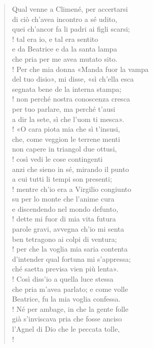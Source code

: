 \documentclass[a4paper, twoside, titlepage]{book}
\begin{document}
\begin{verse}
Qual venne a Climené, per accertarsi\\
di ciò ch’avea incontro a sé udito,\\
quei ch’ancor fa li padri ai figli scarsi;\\!
tal era io, e tal era sentito\\
e da Beatrice e da la santa lampa\\
che pria per me avea mutato sito.\\!
Per che mia donna «Manda fuor la vampa\\
del tuo disio», mi disse, «sì ch’ella esca\\
segnata bene de la interna stampa;\\!
non perché nostra conoscenza cresca\\
per tuo parlare, ma perché t’ausi\\
a dir la sete, sì che l’uom ti mesca».\\!
«O cara piota mia che sì t’insusi,\\
che, come veggion le terrene menti\\
non capere in triangol due ottusi,\\!
così vedi le cose contingenti\\
anzi che sieno in sé, mirando il punto\\
a cui tutti li tempi son presenti;\\!
mentre ch’io era a Virgilio congiunto\\
su per lo monte che l’anime cura\\
e discendendo nel mondo defunto,\\!
dette mi fuor di mia vita futura\\
parole gravi, avvegna ch’io mi senta\\
ben tetragono ai colpi di ventura;\\!
per che la voglia mia saria contenta\\
d’intender qual fortuna mi s’appressa;\\
ché saetta previsa vien più lenta».\\!
Così diss’io a quella luce stessa\\
che pria m’avea parlato; e come volle\\
Beatrice, fu la mia voglia confessa.\\!
Né per ambage, in che la gente folle\\
già s’inviscava pria che fosse anciso\\
l’Agnel di Dio che le peccata tolle,\\!

\end{verse}
\end{document}
